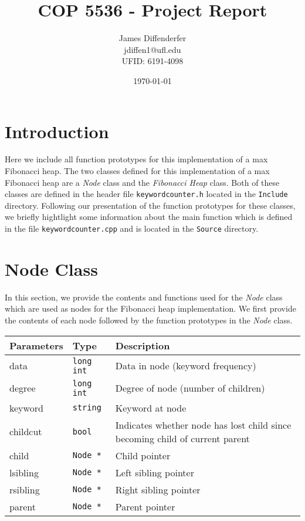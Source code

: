 \documentclass[12pt, reqno]{amsart}
\title{COP 5536 - Project Report}
\author[James Diffenderfer]{James Diffenderfer \\ jdiffen1@ufl.edu \\ UFID: 6191-4098}
\date{\today}
\begin{document}
\maketitle

\section*{Introduction}

Here we include all function prototypes for this implementation of a max Fibonacci heap. The two classes defined for this implementation of a max Fibonacci heap are a \emph{Node} class and the \emph{Fibonacci Heap} class. Both of these classes are defined in the header file \texttt{keywordcounter.h} located in the \texttt{Include} directory. Following our presentation of the function prototypes for these classes, we briefly hightlight some information about the main function which is defined in the file \texttt{keywordcounter.cpp} and is located in the \texttt{Source} directory.

\section*{Node Class}
In this section, we provide the contents and functions used for the \emph{Node} class which are used as nodes for the Fibonacci heap implementation. We first provide the contents of each node followed by the function prototypes in the \emph{Node} class. 

\begin{center}
    \begin{tabular}{| l | l | p{11cm} |}
    \hline
    {\bfseries Parameters} & {\bfseries Type} & {\bfseries Description} \\ \hline
    data & \texttt{long int} & Data in node (keyword frequency) \\ \hline
    degree & \texttt{long int} & Degree of node (number of children) \\ \hline
    keyword & \texttt{string} & Keyword at node \\ \hline
    childcut & \texttt{bool} & Indicates whether node has lost child since becoming child of current parent \\ \hline
    child & \texttt{Node *} & Child pointer \\ \hline
    lsibling & \texttt{Node *} & Left sibling pointer \\ \hline
    rsibling & \texttt{Node *} & Right sibling pointer \\ \hline
    parent & \texttt{Node *} & Parent pointer \\ \hline
    \end{tabular}
\end{center}
\vspace{5mm}
\end{document}
